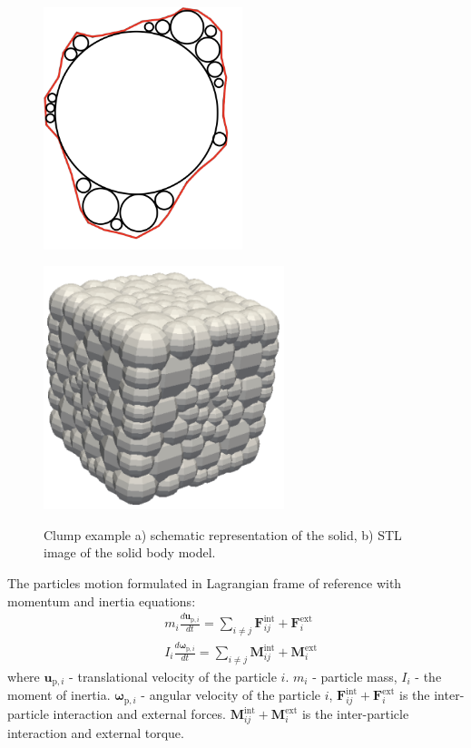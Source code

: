 \begin{figure}[!htp]
\centering
\parbox{7cm}{
\includegraphics[width=5.8cm]{Images/clump1.png}
\subcaption{}
\label{fig:3figsA}}
\qquad
\begin{minipage}{7cm}
\includegraphics[width=7cm]{Images/clump2.png}
\subcaption{}
\label{fig:3figsB}
\end{minipage}
\caption{Clump example a) schematic representation of the solid, b) STL image of the solid body model.}
\end{figure}
The particles motion formulated in Lagrangian frame of reference \cite{cundall1979discrete} with momentum and inertia equations:
\begin{equation}\label{solid_body_force}
\begin{aligned}
& m_i \frac{d \boldsymbol{u}_{\mathrm{p}, i}}{d t}=\sum_{i \neq j} \boldsymbol{F}_{i j}^{\mathrm{int}}+\boldsymbol{F}_i^{\mathrm{ext}} \\
& I_i \frac{d \boldsymbol{\omega}_{\mathrm{p}, i}}{d t}=\sum_{i \neq j} \boldsymbol{M}_{i j}^{\mathrm{int}}+\boldsymbol{M}_i^{\mathrm{ext}}
\end{aligned}
\end{equation}
where $\mathbf{u}_{\mathrm{p}, i}$ - translational velocity of the particle $i$. $m_i$ - particle mass, $I_i$ - the moment of inertia. $\boldsymbol{\omega}_{\mathrm{p}, i}$ - angular velocity of the particle $i$, $\boldsymbol{F}_{i j}^{\mathrm{int}}+\boldsymbol{F}_i^{\mathrm{ext}}$ is the inter-particle interaction and external forces.   $\boldsymbol{M}_{i j}^{\mathrm{int}}+\boldsymbol{M}_i^{\mathrm{ext}}$ is the inter-particle interaction and external torque.

